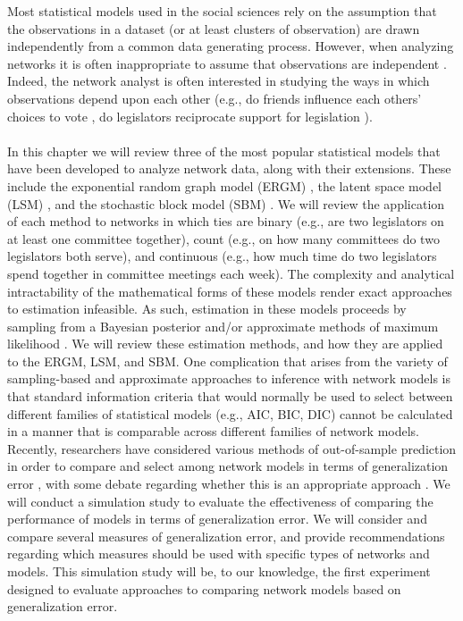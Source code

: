 \documentclass[fleqn,12pt]{wlscirep}
\title{\centering{Chapter 48 Outline\\
\large{Network Modeling: Estimation, Inference, Comparison, and Selection}
}}
{\centering
\author[1]{John P. Schoeneman}
\author[1]{Bruce A.  Desmarais}
\affil[1]{Penn State, Political Science, University Park, Pond Lab}
}
\begin{document}
\flushbottom
\maketitle{}
\vspace{-1.5cm}
 Most statistical models used in the social sciences rely on the assumption that the observations in a dataset (or at least clusters of observation) are drawn independently from a common data generating process.  However, when analyzing networks it is often inappropriate to assume that observations are independent \citep{desmarais2017statistical}. Indeed, the network analyst is often interested in studying the ways in which observations depend upon each other  (e.g., do friends influence each others' choices to vote \citep{bond201261}, do legislators reciprocate support for legislation \citep{kirkland2014partisanship}). 
\\~\\
 In this chapter we will review three of the most popular statistical models that have been developed to analyze network data, along with their extensions. These include the exponential random graph model (ERGM) \citep{cranmer2011inferential}, the latent space model (LSM) \citep{dorff2016latent},  and the stochastic block model (SBM) \citep{latouche2011overlapping}. We will review the application of each method to networks in which ties are binary (e.g., are two legislators on at least one committee together), count (e.g., on how many committees do two legislators both serve), and continuous (e.g., how much time do two legislators spend together in committee meetings each week). The complexity and analytical intractability of the mathematical forms of these models render exact approaches to estimation infeasible. As such, estimation in these models proceeds by sampling from a Bayesian posterior and/or approximate methods of maximum likelihood \citep{raftery2012fast,van2009framework,nowicki2001estimation}. We will review these estimation methods, and how they are applied to the ERGM, LSM, and SBM. One complication that arises from the variety of sampling-based and approximate approaches to inference with network models is that standard information criteria that would normally be used to select between different families of statistical models (e.g., AIC, BIC, DIC) cannot be calculated in a manner that is comparable across different families of network models. Recently, researchers have considered various methods of out-of-sample prediction in order to compare and select among network models in terms of generalization error \citep[e.g.,][]{desmarais2012micro,dorff2016latent}, with some debate regarding whether this is an appropriate approach \citep{block2018change}. We will conduct a simulation study to evaluate the effectiveness of comparing the performance of models in terms of generalization error. We will consider and compare several measures of generalization error, and provide recommendations regarding which measures should be used with specific types of networks and models. This simulation study will be, to our knowledge, the first experiment designed to evaluate approaches to comparing network models based on generalization error.
\end{document}
